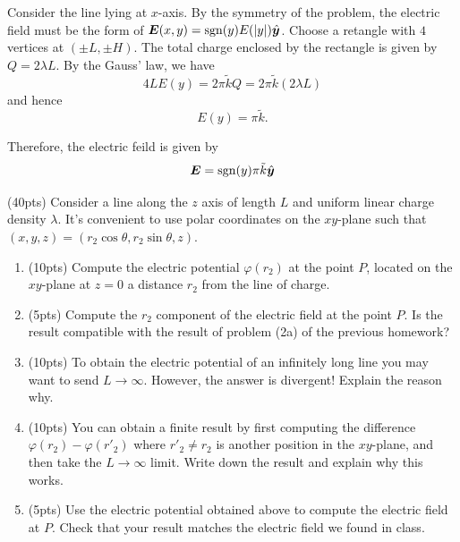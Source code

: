 \documentclass{article}
\begin{document}
\begin{solution}
  Consider the line lying at \( x \)-axis. By the symmetry of the problem, the electric field must be the form of \( \boldsymbol{E}(x,y)=\operatorname{sgn}(y) E(|y|)\hat{\boldsymbol{y}} \). Choose a retangle with \( 4 \) vertices at \( (\pm L,\pm H) \). The total charge enclosed by the rectangle is given by \( Q=2\lambda L \). By the Gauss' law, we have
  \[ 4L E(y) = 2\pi\tilde{k}Q = 2\pi\tilde{k}(2\lambda L) \]
  and hence
  \[ E(y) = \pi\tilde{k}. \]

  Therefore, the electric feild is given by
  \[ \boldsymbol{E} = \operatorname{sgn}(y) \pi\tilde{k} \hat{\boldsymbol{y}} \]
\end{solution}



\begin{problem}
(40pts) Consider a line along the $z$ axis of length $L$ and uniform linear charge density $\lambda$. It's convenient to use polar coordinates on the $xy$-plane such that $(x,y,z) = (r_2 \cos\theta, r_2 \sin\theta, z)$.

\begin{figure}[H]
    \centering
\end{figure}

\begin{enumerate}[label=(\alph*)]
    \item (10pts) Compute the electric potential $\varphi(r_2)$ at the point $P$, located on the $xy$-plane at $z=0$ a distance $r_2$ from the line of charge.
    \item (5pts) Compute the $r_2$ component of the electric field at the point $P$. Is the result compatible with the result of problem (2a) of the previous homework?
    \item (10pts) To obtain the electric potential of an infinitely long line you may want to send $L \to \infty$. However, the answer is divergent! Explain the reason why.
    \item (10pts) You can obtain a finite result by first computing the difference $\varphi(r_2) - \varphi(r'_2)$ where $r'_2 \neq r_2$ is another position in the $xy$-plane, and then take the $L \to \infty$ limit. Write down the result and explain why this works.
    \item (5pts) Use the electric potential obtained above to compute the electric field at $P$. Check that your result matches the electric field we found in class.
\end{enumerate}
\end{problem}
\end{document}
